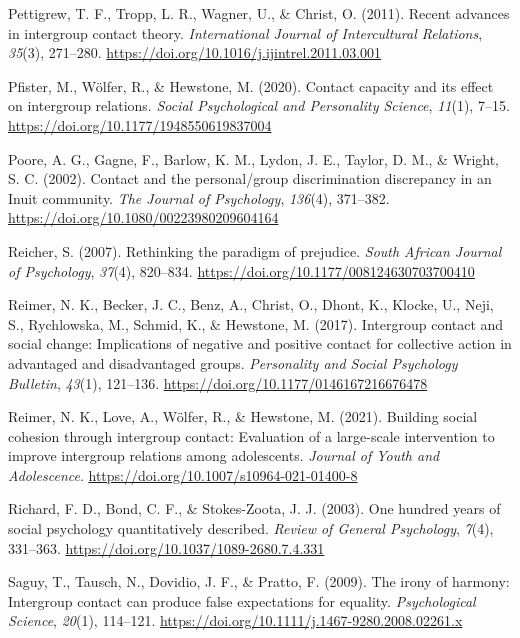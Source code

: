 \documentclass[12pt, letterpaper]{article}
\begin{document}
\leavevmode\hypertarget{ref-pettigrew_recent_2011}{}%
Pettigrew, T. F., Tropp, L. R., Wagner, U., \& Christ, O. (2011). Recent
advances in intergroup contact theory. \emph{International Journal of
Intercultural Relations}, \emph{35}(3), 271--280.
\url{https://doi.org/10.1016/j.ijintrel.2011.03.001}

\leavevmode\hypertarget{ref-pfister_contact_2020}{}%
Pfister, M., Wölfer, R., \& Hewstone, M. (2020). Contact capacity and
its effect on intergroup relations. \emph{Social Psychological and
Personality Science}, \emph{11}(1), 7--15.
\url{https://doi.org/10.1177/1948550619837004}

\leavevmode\hypertarget{ref-poore_contact_2002}{}%
Poore, A. G., Gagne, F., Barlow, K. M., Lydon, J. E., Taylor, D. M., \&
Wright, S. C. (2002). Contact and the personal/group discrimination
discrepancy in an Inuit community. \emph{The Journal of Psychology},
\emph{136}(4), 371--382. \url{https://doi.org/10.1080/00223980209604164}

\leavevmode\hypertarget{ref-reicher_rethinking_2007}{}%
Reicher, S. (2007). Rethinking the paradigm of prejudice. \emph{South
African Journal of Psychology}, \emph{37}(4), 820--834.
\url{https://doi.org/10.1177/008124630703700410}

\leavevmode\hypertarget{ref-reimer_intergroup_2017}{}%
Reimer, N. K., Becker, J. C., Benz, A., Christ, O., Dhont, K., Klocke,
U., Neji, S., Rychlowska, M., Schmid, K., \& Hewstone, M. (2017).
Intergroup contact and social change: Implications of negative and
positive contact for collective action in advantaged and disadvantaged
groups. \emph{Personality and Social Psychology Bulletin}, \emph{43}(1),
121--136. \url{https://doi.org/10.1177/0146167216676478}

\leavevmode\hypertarget{ref-reimer_building_2021}{}%
Reimer, N. K., Love, A., Wölfer, R., \& Hewstone, M. (2021). Building
social cohesion through intergroup contact: Evaluation of a large-scale
intervention to improve intergroup relations among adolescents.
\emph{Journal of Youth and Adolescence}.
\url{https://doi.org/10.1007/s10964-021-01400-8}

\leavevmode\hypertarget{ref-richard_one_2003}{}%
Richard, F. D., Bond, C. F., \& Stokes-Zoota, J. J. (2003). One hundred
years of social psychology quantitatively described. \emph{Review of
General Psychology}, \emph{7}(4), 331--363.
\url{https://doi.org/10.1037/1089-2680.7.4.331}

\leavevmode\hypertarget{ref-saguy_irony_2009}{}%
Saguy, T., Tausch, N., Dovidio, J. F., \& Pratto, F. (2009). The irony
of harmony: Intergroup contact can produce false expectations for
equality. \emph{Psychological Science}, \emph{20}(1), 114--121.
\url{https://doi.org/10.1111/j.1467-9280.2008.02261.x}
\end{document}

